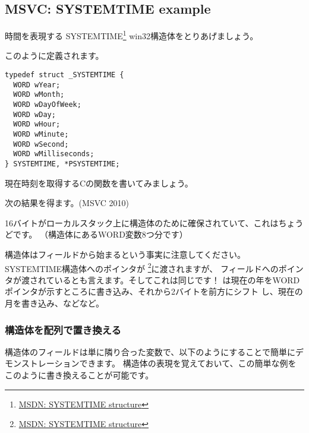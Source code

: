 ﻿\subsection{MSVC: SYSTEMTIME example}
\label{sec:SYSTEMTIME}

\newcommand{\FNSYSTEMTIME}{\footnote{\href{http://go.yurichev.com/17260}{MSDN: SYSTEMTIME structure}}}

時間を表現する SYSTEMTIME\FNSYSTEMTIME{} win32構造体をとりあげましょう。

このように定義されます。

\begin{lstlisting}[caption=WinBase.h,style=customc]
typedef struct _SYSTEMTIME {
  WORD wYear;
  WORD wMonth;
  WORD wDayOfWeek;
  WORD wDay;
  WORD wHour;
  WORD wMinute;
  WORD wSecond;
  WORD wMilliseconds;
} SYSTEMTIME, *PSYSTEMTIME;
\end{lstlisting}

現在時刻を取得するCの関数を書いてみましょう。



次の結果を得ます。(MSVC 2010)



16バイトがローカルスタック上に構造体のために確保されていて、これはちょうどです。
（構造体にあるWORD変数8つ分です）

\newcommand{\FNMSDNGST}{\footnote{\href{http://go.yurichev.com/17261}{MSDN: GetSystemTime function}}}

構造体はフィールドから始まるという事実に注意してください。
SYSTEMTIME構造体へのポインタが \FNSYSTEMTIME に渡されますが、
フィールドへのポインタが渡されているとも言えます。そしてこれは同じです！
は現在の年をWORDポインタが示すところに書き込み、それから2バイトを前方にシフト
し、現在の月を書き込み、などなど。



\subsubsection{構造体を配列で置き換える}

構造体のフィールドは単に隣り合った変数で、以下のようにすることで簡単にデモンストレーションできます。
構造体の表現を覚えておいて、この簡単な例をこのように書き換えることが可能です。

